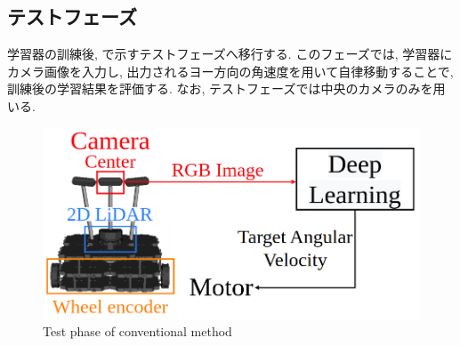\subsection{テストフェーズ}
学習器の訓練後, で示すテストフェーズへ移行する. このフェーズでは, 学習器にカメラ画像を入力し, 出力されるヨー方向の角速度を用いて自律移動することで, 訓練後の学習結果を評価する. なお, テストフェーズでは中央のカメラのみを用いる.

\vspace{1cm}


\begin{figure}[hbtp]
  \centering
 \includegraphics[keepaspectratio, scale=0.3]
      {images/test_phase2.png}
 \caption{Test phase of conventional method}
 \label{Fig:test_phase}
\end{figure}


\newpage